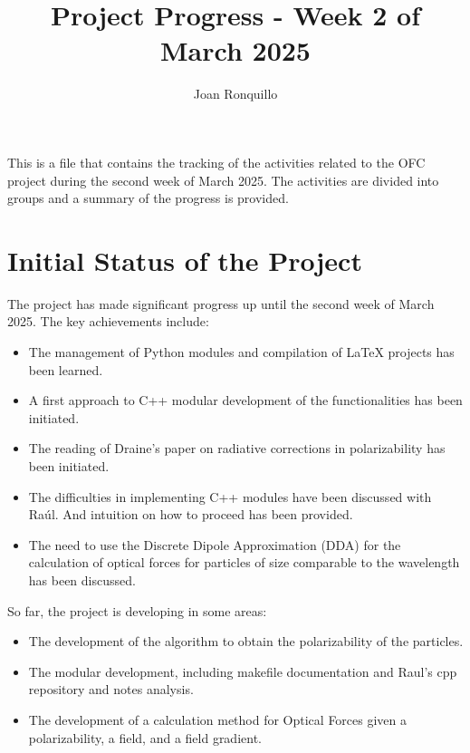 \documentclass[12pt]{article}
\begin{document}
\author{Joan Ronquillo}

\title{Project Progress - Week 2 of March 2025}
\maketitle

This is a file that contains the tracking of the activities related to the OFC project during the second week of March 2025.
The activities are divided into groups and a summary of the progress is provided.

\section{Initial Status of the Project}
The project has made significant progress up until the second week of March 2025. The key achievements include:
\begin{itemize}
    \item The management of Python modules and compilation of LaTeX projects has been learned.
    \item A first approach to C++ modular development of the functionalities has been initiated.
    \item The reading of Draine's paper on radiative corrections in polarizability \cite{Draine1988ApJ...333..848D} has been initiated.
    \item The difficulties in implementing C++ modules have been discussed with Raúl. And intuition on how to proceed has been provided.
    \item The need to use the Discrete Dipole Approximation (DDA) for the calculation of optical forces for particles of size comparable to the wavelength has been discussed.
\end{itemize}
So far, the project is developing in some areas:

\begin{itemize}
    \item The development of the algorithm to obtain the polarizability of the particles.
    \item The modular development, including makefile documentation and Raul's cpp repository and notes analysis.
    \item The development of a calculation method for Optical Forces given a polarizability, a field, and a field gradient.
\end{itemize}
\end{document}
